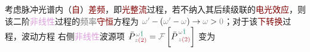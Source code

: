 考虑\textcolor{NavyBlue}{脉冲光}谱内（\textcolor{Maroon}{自}）\textcolor{Maroon}{差频}，即\textcolor{Maroon}{光整流}过程，若不纳入其后续级联的\textcolor{Maroon}{电光效应}，则该二阶\textcolor{Plum}{非线性}过程的\textcolor{gray}{频率}\textcolor{Maroon}{守恒}方程为 $ \textcolor{gray}{\omega'} - \left( \textcolor{gray}{\omega'}-\textcolor{gray}{\omega} \right) \to \textcolor{gray}{\omega} > \textcolor{gray}{0}$；对于该\textcolor{Maroon}{下转换}过程，波动方程  右侧\textcolor{Plum}{非线性}\textcolor{NavyBlue}{波源}项 $\Xint{\mathcolor{gray}{-}}{25}{\bar{P}}^{\;\! \mathcolor{gray}{\omega} \textcolor{PineGreen}{\hat{1}} }_{\;\! \mathcolor{gray}{z}  \textcolor{Maroon}{(2)}} = \mathcolor{gray}{\mathcal F} \left[ {\bar{P}}^{\;\! \mathcolor{gray}{\omega} \textcolor{PineGreen}{\hat{1}} }_{\;\! \mathcolor{gray}{z}  \textcolor{Maroon}{(2)}} \right]$ 变为
